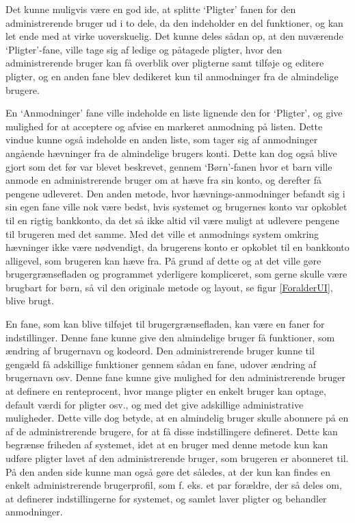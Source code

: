 Det kunne muligvis være en god ide, at splitte ‘Pligter’ fanen for den administrerende bruger ud i to dele, da den indeholder en del funktioner, og kan let ende med at virke uoverskuelig. Det kunne deles sådan op, at den nuværende ‘Pligter’-fane, ville tage sig af ledige og påtagede pligter, hvor den administrerende bruger kan få overblik over pligterne samt tilføje og editere pligter, og en anden fane blev dedikeret kun til anmodninger fra de almindelige brugere.

En ‘Anmodninger’ fane ville indeholde en liste lignende den for ‘Pligter’, og give mulighed for at acceptere og afvise en markeret anmodning på listen. Dette vindue kunne også indeholde en anden liste, som tager sig af anmodninger angående hævninger fra de almindelige brugers konti. Dette kan dog også blive gjort som det før var blevet beskrevet, gennem ‘Børn’-fanen hvor et barn ville anmode en administrerende bruger om at hæve fra sin konto, og derefter få pengene udleveret. Den anden metode, hvor hævnings-anmodninger befandt sig i sin egen fane ville nok være bedst, hvis systemet og brugernes konto var opkoblet til en rigtig bankkonto, da det så ikke altid vil være muligt at udlevere pengene til brugeren med det samme. Med det ville et anmodnings system omkring hævninger ikke være nødvendigt, da brugerens konto er opkoblet til en bankkonto alligevel, som brugeren kan hæve fra. På grund af dette og at det ville gøre brugergrænsefladen og programmet yderligere kompliceret, som gerne skulle være brugbart for børn, så vil den originale metode og layout, se figur \ref{ForalderUI}, blive brugt.

En fane, som kan blive tilføjet til brugergrænsefladen, kan være en faner for indstillinger. Denne fane kunne give den almindelige bruger få funktioner, som ændring af brugernavn og kodeord. Den administrerende bruger kunne til gengæld få adskillige funktioner gennem sådan en fane, udover ændring af brugernavn osv. Denne fane kunne give mulighed for den administrerende bruger at definere en renteprocent, hvor mange pligter en enkelt bruger kan optage, default værdi for pligter osv., og med det give adskillige administrative muligheder. Dette ville dog betyde, at en almindelig bruger skulle abonnere på en af de administrerende brugere, for at få disse indstillingere defineret. Dette kan begrænse friheden af systemet, idet at en bruger med denne metode kun kan udføre pligter lavet af den administrerende bruger, som brugeren er abonneret til. På den anden side kunne man også gøre det således, at der kun kan findes en enkelt administrerende brugerprofil, som f. eks. et par forældre, der så deles om, at definerer indstillingerne for systemet, og samlet laver pligter og behandler anmodninger.
